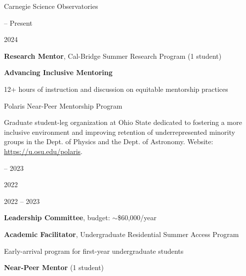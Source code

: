 \documentclass[cv.tex]{subfiles}
\begin{document}
{\color{themecolor} Carnegie Science Observatories}
\par\noindent
\parbox{0.18\textwidth}{%
	 -- Present \par
	2024 \par
	\null \par
}
\hspace{1mm}
\parbox{0.8\textwidth}{%
	\textbf{Research Mentor}, Cal-Bridge Summer Research Program (1 student)
	\par
	\textbf{Advancing Inclusive Mentoring} \par
	12+ hours of instruction and discussion on equitable mentorship practices
	\par
}

\vspace{5mm}
\noindent
{\color{themecolor} Polaris Near-Peer Mentorship Program}
\par\noindent
Graduate student-leg organization at Ohio State dedicated to fostering a more
inclusive environment and improving retention of underrepresented minority
groups in the Dept. of Physics and the Dept. of Astronomy.
Website: \url{https://u.osu.edu/polaris}.
\par\noindent
\parbox{0.18\textwidth}{%
	 -- 2023 \par
	2022 \par
	\null \par
	2022 -- 2023 \par
}
\hspace{1mm}
\parbox{0.8\textwidth}{%
	\textbf{Leadership Committee}, budget: $\sim$\$60,000/year \par
	\textbf{Academic Facilitator}, Undergraduate Residential Summer Access
	Program \par
	Early-arrival program for first-year undergraduate students \par
	\textbf{Near-Peer Mentor} (1 student) \par
}
\end{document}
